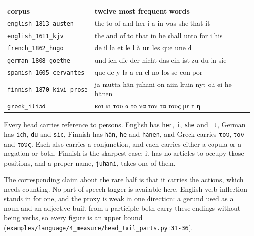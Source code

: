 \tiny
\setlength{\tabcolsep}{2pt}
\begin{longtable}{@{}>{\setlength{\rightskip}{0pt}\setlength{\parfillskip}{0pt}\arraybackslash}p{}>{\setlength{\rightskip}{0pt}\setlength{\parfillskip}{0pt}\arraybackslash}p{}@{}}
\toprule
corpus & twelve most frequent words \\
\midrule
\texttt{english\_\allowbreak{}1813\_\allowbreak{}austen} & the to of and her i a in was she that it \\
\texttt{english\_\allowbreak{}1611\_\allowbreak{}kjv} & the and of to that in he shall unto for i his \\
\texttt{french\_\allowbreak{}1862\_\allowbreak{}hugo} & de il la et le l à un les que une d \\
\texttt{german\_\allowbreak{}1808\_\allowbreak{}goethe} & und ich die der nicht das ein ist zu du in sie \\
\texttt{spanish\_\allowbreak{}1605\_\allowbreak{}cervantes} & que de y la a en el no los se con por \\
\texttt{finnish\_\allowbreak{}1870\_\allowbreak{}kivi\_\allowbreak{}prose} & ja mutta hän juhani on niin kuin nyt oli ei he hänen \\
\texttt{greek\_\allowbreak{}iliad} & και κι του ο το να τον τα τους με τ η \\
\bottomrule
\end{longtable}
\normalsize

Every head carries reference to persons. English has \texttt{her}, \texttt{i}, \texttt{she} and \texttt{it}, German has \texttt{ich}, \texttt{du} and \texttt{sie}, Finnish has \texttt{hän}, \texttt{he} and \texttt{hänen}, and Greek carries \texttt{του}, \texttt{τον} and \texttt{τους}. Each also carries a conjunction, and each carries either a copula or a negation or both. Finnish is the sharpest case: it has no articles to occupy those positions, and a proper name, \texttt{juhani}, takes one of them.

The corresponding claim about the rare half is that it carries the actions, which needs counting. No part of speech tagger is available here. English verb inflection stands in for one, and the proxy is weak in one direction: a gerund used as a noun and an adjective built from a participle both carry these endings without being verbs, so every figure is an upper bound (\texttt{examples/\allowbreak{}language/\allowbreak{}4\_\allowbreak{}measure/\allowbreak{}head\_\allowbreak{}tail\_\allowbreak{}parts.\allowbreak{}py:31-\allowbreak{}36}).

